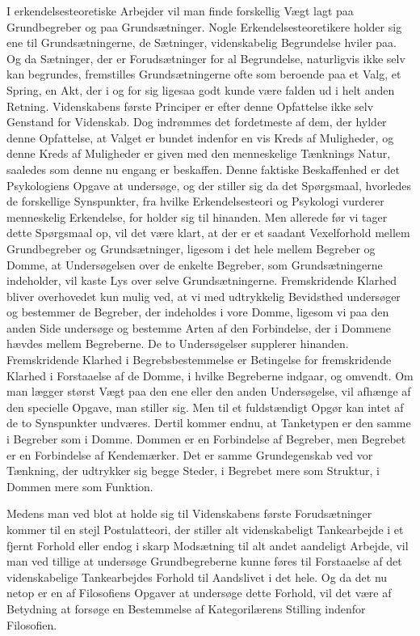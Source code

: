 \documentclass[12pt]{article}
\newcommand{\opage}[1]{\marginnote{\footnotesize\textit{[#1]}}}
\begin{document}
I erkendelsesteoretiske Arbejder vil man finde forskellig Vægt lagt paa
Grundbegreber og paa Grundsætninger. Nogle Erkendelsesteoretikere holder sig ene
til Grundsætningerne, de Sætninger, videnskabelig Begrundelse hviler paa. Og da
Sætninger, der er Forudsætninger for al Begrundelse, naturligvis ikke selv kan
begrundes, fremstilles Grundsætningerne ofte som beroende paa et Valg, et
Spring, en Akt, der i og for sig ligesaa godt kunde være falden ud i helt anden
Retning. Videnskabens første Principer er efter denne Opfattelse ikke selv
Genstand for Videnskab. Dog indrømmes det fordetmeste af dem, der hylder denne
Opfattelse, at Valget er bundet indenfor en vis Kreds af Muligheder, og denne
Kreds af Muligheder er given med den menneskelige Tænknings Natur, saaledes som
denne nu engang er beskaffen. Denne faktiske Beskaffenhed er det Psykologiens
Opgave at undersøge, og der stiller sig da det Spørgsmaal, hvorledes de
forskellige Synspunkter, fra hvilke Erkendelsesteori og Psykologi vurderer
menneskelig Erkendelse, for%
\opage{4}holder sig til hinanden. Men allerede før vi tager dette Spørgsmaal op,
vil det være klart, at der er et saadant Vexelforhold mellem Grundbegreber og
Grundsætninger, ligesom i det hele mellem Begreber og Domme, at Undersøgelsen
over de enkelte Begreber, som Grundsætningerne indeholder, vil kaste Lys over
selve Grundsætningerne. Fremskridende Klarhed bliver overhovedet kun mulig ved,
at vi med udtrykkelig Bevidsthed undersøger og bestemmer de Begreber, der
indeholdes i vore Domme, ligesom vi paa den anden Side undersøge og bestemme
Arten af den Forbindelse, der i Dommene hævdes mellem Begreberne. De to
Undersøgelser supplerer hinanden. Fremskridende Klarhed i Begrebsbestemmelse er
Betingelse for fremskridende Klarhed i Forstaaelse af de Domme, i hvilke
Begreberne indgaar, og omvendt. Om man lægger størst Vægt paa den ene eller den
anden Undersøgelse, vil afhænge af den specielle Opgave, man stiller sig. Men
til et fuldstændigt Opgør kan intet af de to Synspunkter undværes. Dertil kommer
endnu, at Tanketypen er den samme i Begreber som i Domme. Dommen er en
Forbindelse af Begreber, men Begrebet er en Forbindelse af Kendemærker. Det er
samme Grundegenskab ved vor Tænkning, der udtrykker sig begge Steder, i
Begrebet mere som Struktur, i Dommen mere som Funktion.

Medens man ved blot at holde sig til Videnskabens første Forudsætninger kommer
til en stejl Postulatteori, der stiller alt videnskabeligt Tankearbejde i et
fjernt Forhold eller endog i skarp Modsætning til alt andet aandeligt Arbejde,
vil man ved tillige at undersøge Grundbegreberne kunne føres til Forstaaelse af
det videnskabelige Tankearbejdes Forhold til Aandslivet i det hele. Og da det nu
netop er en af Filosofiens Opgaver at undersøge dette Forhold, vil det være af
Betydning at forsøge en Bestemmelse af Kategorilærens Stilling indenfor
Filosofien.
\end{document}
